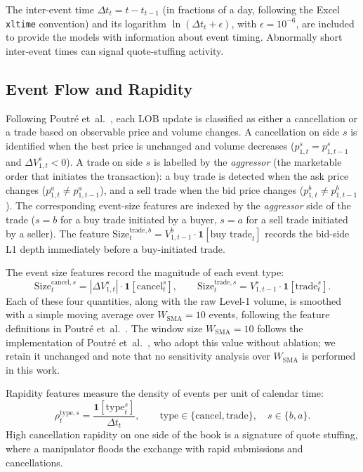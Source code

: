 \documentclass[11pt]{report}
\begin{document}
The inter-event time $\Delta t_t = t - t_{t-1}$ (in fractions of a day, following the Excel \texttt{xltime} convention) and its logarithm $\ln(\Delta t_t + \epsilon)$, with $\epsilon = 10^{-6}$, are included to provide the models with information about event timing. Abnormally short inter-event times can signal quote-stuffing activity.


\subsection{Event Flow and Rapidity}\label{subsec:features:eventflow}

Following Poutr\'e et~al.~\cite{poutre_2024}, each LOB update is classified as either a cancellation or a trade based on observable price and volume changes. A cancellation on side $s$ is identified when the best price is unchanged and volume decreases ($p^s_{1,t} = p^s_{1,t-1}$ and $\Delta V^s_{1,t} < 0$). A trade on side $s$ is labelled by the \emph{aggressor} (the marketable order that initiates the transaction): a buy trade is detected when the ask price changes ($p^a_{1,t} \neq p^a_{1,t-1}$), and a sell trade when the bid price changes ($p^b_{1,t} \neq p^b_{1,t-1}$). The corresponding event-size features are indexed by the \emph{aggressor} side of the trade ($s = b$ for a buy trade initiated by a buyer, $s = a$ for a sell trade initiated by a seller).  The feature $\text{Size}_t^{\text{trade},b} = V^b_{1,t-1} \cdot \mathbf{1}[\text{buy trade}_t]$ records the bid-side L1 depth immediately before a buy-initiated trade.

The event size features record the magnitude of each event type:
\begin{equation}
  \label{eq:event_size}
  \text{Size}_t^{\text{cancel},s} = |\Delta V^s_{1,t}| \cdot \mathbf{1}[\text{cancel}^s_t], \qquad
  \text{Size}_t^{\text{trade},s} = V^s_{1,t-1} \cdot \mathbf{1}[\text{trade}^s_t].
\end{equation}
Each of these four quantities, along with the raw Level-1 volume, is smoothed with a simple moving average over $W_{\text{SMA}} = 10$ events, following the feature definitions in Poutr\'e et~al.~\cite{poutre_2024}. The window size $W_{\text{SMA}} = 10$ follows the implementation of Poutr\'e et~al.~\cite{poutre_2024}, who adopt this value without ablation; we retain it unchanged and note that no sensitivity analysis over $W_{\text{SMA}}$ is performed in this work.

Rapidity features measure the density of events per unit of calendar time:
\begin{equation}
  \label{eq:rapidity}
  \rho_t^{\text{type},s} = \frac{\mathbf{1}[\text{type}^s_t]}{\Delta t_t}, \qquad \text{type} \in \{\text{cancel}, \text{trade}\}, \quad s \in \{b, a\}.
\end{equation}
High cancellation rapidity on one side of the book is a signature of quote stuffing, where a manipulator floods the exchange with rapid submissions and cancellations.
\end{document}
